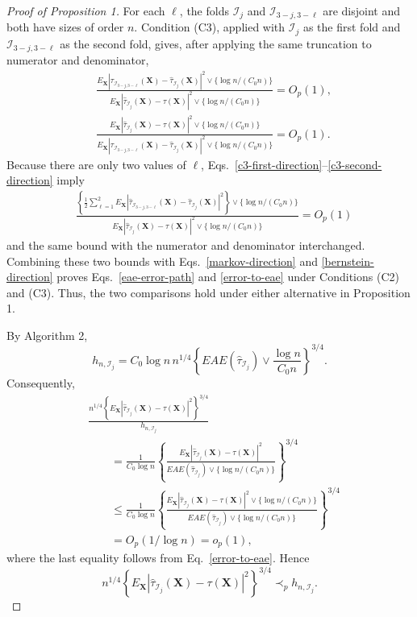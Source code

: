 \documentclass[11pt]{article}
\theoremstyle{referenceplain}
\theoremstyle{referencedefinition}
\theoremstyle{referenceremark}
\begin{document}
\begin{proof}[Proof of Proposition 1]
For each $\ell$, the folds $\mathcal I_j$ and
$\mathcal I_{3-j,3-\ell}$ are disjoint and both have sizes of order
$n$. Condition (C3), applied with $\mathcal I_j$ as the first fold and
$\mathcal I_{3-j,3-\ell}$ as the second fold, gives, after applying the
same truncation to numerator and denominator,
\begin{align}
&
\frac{
E_{\mathbf X}\left|
\widehat\tau_{\mathcal I_{3-j,3-\ell}}(\mathbf X)
-\widehat\tau_{\mathcal I_j}(\mathbf X)
\right|^2
\vee\{\log n/({C_0}n)\}
}{
E_{\mathbf X}
|\widehat\tau_{\mathcal I_j}(\mathbf X)-\tau(\mathbf X)|^2
\vee\{\log n/({C_0}n)\}
}
=O_p(1),
\label{c3-first-direction}
\\
&
\frac{
E_{\mathbf X}
|\widehat\tau_{\mathcal I_j}(\mathbf X)-\tau(\mathbf X)|^2
\vee\{\log n/({C_0}n)\}
}{
E_{\mathbf X}\left|
\widehat\tau_{\mathcal I_{3-j,3-\ell}}(\mathbf X)
-\widehat\tau_{\mathcal I_j}(\mathbf X)
\right|^2
\vee\{\log n/({C_0}n)\}
}
=O_p(1).
\label{c3-second-direction}
\end{align}
Because there are only two values of $\ell$,
Eqs.~\eqref{c3-first-direction}--\eqref{c3-second-direction} imply
\begin{align}
&
\frac{
\left\{
\displaystyle
\frac12\sum_{\ell=1}^2
E_{\mathbf X}\left|
\widehat\tau_{\mathcal I_{3-j,3-\ell}}(\mathbf X)
-\widehat\tau_{\mathcal I_j}(\mathbf X)
\right|^2
\right\}
\vee\{\log n/({C_0}n)\}
}{
E_{\mathbf X}
|\widehat\tau_{\mathcal I_j}(\mathbf X)-\tau(\mathbf X)|^2
\vee\{\log n/({C_0}n)\}
}
=O_p(1)
\end{align}
and the same bound with the numerator and denominator interchanged.
Combining these two bounds with
Eqs.~\eqref{markov-direction} and \eqref{bernstein-direction} proves
Eqs.~\eqref{eae-error-path} and \eqref{error-to-eae} under Conditions
(C2) and (C3). Thus, the two comparisons hold under either alternative
in Proposition 1.

By Algorithm 2,
\[
h_{n,\mathcal I_j}
=
{C_0}\log n\,n^{1/4}
\left\{
EAE(\widehat\tau_{\mathcal I_j})
\vee\frac{\log n}{{C_0}n}
\right\}^{3/4}.
\]
Consequently,
\begin{align*}
&\frac{
n^{1/4}
\left\{
E_{\mathbf X}
|\widehat\tau_{\mathcal I_j}(\mathbf X)-\tau(\mathbf X)|^2
\right\}^{3/4}
}{
h_{n,\mathcal I_j}
}\\
&\qquad=
\frac1{{C_0}\log n}
\left\{
\frac{
E_{\mathbf X}
|\widehat\tau_{\mathcal I_j}(\mathbf X)-\tau(\mathbf X)|^2
}{
EAE(\widehat\tau_{\mathcal I_j})\vee\{\log n/({C_0}n)\}
}
\right\}^{3/4}\\
&\qquad\le
\frac1{{C_0}\log n}
\left\{
\frac{
E_{\mathbf X}
|\widehat\tau_{\mathcal I_j}(\mathbf X)-\tau(\mathbf X)|^2
\vee\{\log n/({C_0}n)\}
}{
EAE(\widehat\tau_{\mathcal I_j})\vee\{\log n/({C_0}n)\}
}
\right\}^{3/4}\\
&\qquad=
O_p(1/\log n)
=
o_p(1),
\end{align*}
where the last equality follows from Eq.~\eqref{error-to-eae}. Hence
\[
n^{1/4}
\left\{
E_{\mathbf X}
|\widehat\tau_{\mathcal I_j}(\mathbf X)-\tau(\mathbf X)|^2
\right\}^{3/4}
\prec_p
h_{n,\mathcal I_j}.
\]


\end{proof}
\end{document}
